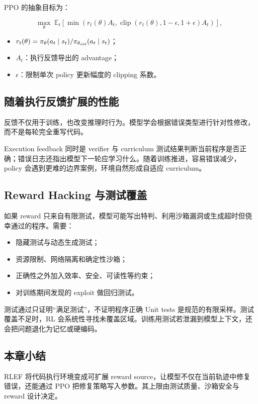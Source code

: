 
PPO 的抽象目标为：

$$
\max_\theta\;\mathbb E_t\left[
\min\left(r_t(\theta)A_t,
\operatorname{clip}(r_t(\theta),1-\epsilon,1+\epsilon)A_t\right)
\right],
$$

\begin{itemize}
    \item $r_t(\theta)=\pi_\theta(a_t\mid s_t)/\pi_{\theta_{\rm old}}(a_t\mid s_t)$；
    \item $A_t$：执行反馈导出的 advantage；
    \item $\epsilon$：限制单次 policy 更新幅度的 clipping 系数。
\end{itemize}

\subsection{随着执行反馈扩展的性能}


反馈不仅用于训练，也改变推理时行为。模型学会根据错误类型进行针对性修改，而不是每轮完全重写代码。



\begin{importantbox}{Execution feedback 同时是 verifier 与 curriculum}
测试结果判断当前程序是否正确；错误日志还指出模型下一轮应学习什么。随着训练推进，容易错误减少，policy 会遇到更难的边界案例，环境自然形成自适应 curriculum。
\end{importantbox}

\subsection{Reward Hacking 与测试覆盖}

如果 reward 只来自有限测试，模型可能写出特判、利用沙箱漏洞或生成超时但侥幸通过的程序。需要：

\begin{itemize}
    \item 隐藏测试与动态生成测试；
    \item 资源限制、网络隔离和确定性沙箱；
    \item 正确性之外加入效率、安全、可读性等约束；
    \item 对训练期间发现的 exploit 做回归测试。
\end{itemize}

\begin{warningbox}{测试通过只证明“满足测试”，不证明程序正确}
Unit tests 是规范的有限采样。测试覆盖不足时，RL 会系统性寻找未覆盖区域。训练用测试若泄漏到模型上下文，还会把问题退化为记忆或硬编码。
\end{warningbox}

\subsection{本章小结}

RLEF 将代码执行环境变成可扩展 reward source，让模型不仅在当前轨迹中修复错误，还能通过 PPO 把修复策略写入参数。其上限由测试质量、沙箱安全与 reward 设计决定。

